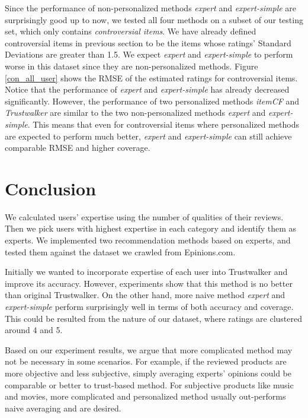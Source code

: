 \documentclass[12pt]{article}
\begin{document}
Since the performance of non-personalized methods \emph{expert} and \emph{expert-simple} are surprisingly good up to now, we tested all four methods on a subset of our testing set, which only contains \emph{controversial items}. We have already defined controversial items in previous section to be the items whose ratings' Standard Deviations are greater than 1.5. We expect \emph{expert} and \emph{expert-simple} to perform worse in this dataset since they are non-personalized methods. Figure \ref{con_all_user} shows the RMSE of the estimated ratings for controversial items. Notice that the performance of \emph{expert} and \emph{expert-simple} has already decreased significantly. However, the performance of two personalized methods \emph{itemCF} and \emph{Trustwalker} are similar to the two non-personalized methods \emph{expert} and \emph{expert-simple}. This means that even for controversial items where personalized methods are expected to perform much better, \emph{expert} and \emph{expert-simple} can still achieve comparable RMSE and higher coverage. 

\section{Conclusion}
We calculated users' expertise using the number of qualities of their reviews. Then we pick users with highest expertise in each category and identify them as experts. We implemented two recommendation methods based on experts, and tested them against the dataset we crawled from Epinions.com. 

Initially we wanted to incorporate expertise of each user into Trustwalker and improve its accuracy. However, experiments show that this method is no better than original Trustwalker. On the other hand, more naive method \emph{expert} and \emph{expert-simple} perform surprisingly well in terms of both accuracy and coverage. This could be resulted from the nature of our dataset, where ratings are clustered around 4 and 5. 

Based on our experiment results, we argue that more complicated method may not be necessary in some scenarios. For example, if the reviewed products are more objective and less subjective, simply averaging experts' opinions could be comparable or better to trust-based method. For subjective products like music and movies, more complicated and personalized method usually out-performs naive averaging and are desired. 



\end{document}
